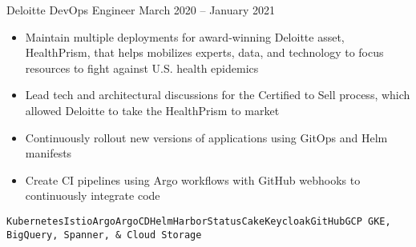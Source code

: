 \documentclass[9pt]{resume} %
\begin{document}
\begin{minipage}[t]{0.6\textwidth}
\begin{entrylist}{Deloitte}
		\entry
			{DevOps Engineer}
			{March 2020 -- January 2021}
			{\begin{itemize}[noitemsep,topsep=0pt,leftmargin=*]
				\item Maintain multiple deployments for award-winning Deloitte asset, HealthPrism, that helps mobilizes experts, data, and technology to focus resources to fight against U.S. health epidemics
				\item Lead tech and architectural discussions for the Certified to Sell process, which allowed Deloitte to take the HealthPrism to market
				\item Continuously rollout new versions of applications using GitOps and Helm manifests
				\item Create CI pipelines using Argo workflows with GitHub webhooks to continuously integrate code
			\end{itemize}				
			{\addtolength{\leftskip}{3mm}\texttt{Kubernetes}\slashsep\texttt{Istio}\slashsep\texttt{Argo}\slashsep\texttt{ArgoCD}\slashsep\texttt{Helm}\slashsep\texttt{Harbor}\slashsep\texttt{StatusCake}\slashsep\texttt{Keycloak}\slashsep\texttt{GitHub}\slashsep\texttt{GCP GKE, BigQuery, Spanner, \& Cloud Storage}\par}}
			
	\end{entrylist}

\end{minipage}			
	
\end{document}
